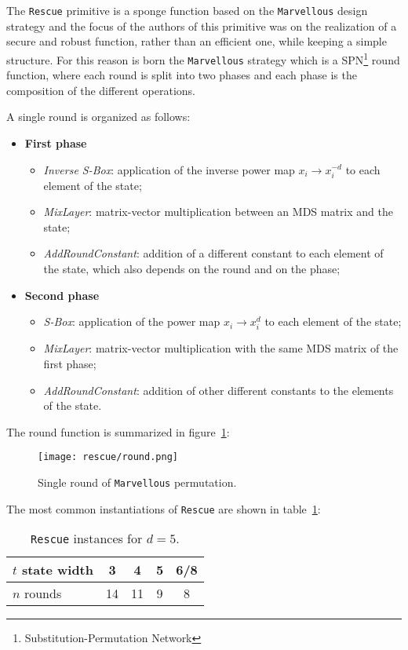 \documentclass[12pt, a4paper]{report}
\begin{document}
The \texttt{Rescue} primitive is a sponge function based on the \texttt{Marvellous} design strategy and the focus of the authors of this primitive was on the realization of a secure and robust function, rather than an efficient one, while keeping a simple structure.
For this reason is born the \texttt{Marvellous} strategy which is a SPN\footnote{Substitution-Permutation Network} round function, where each round is split into two phases and each phase is the composition of the different operations.

A single round is organized as follows:
\begin{itemize}
  \item \textbf{First phase}
  \begin{itemize}
    \item \textit{Inverse S-Box}: application of the inverse power map $x_i \rightarrow x_i^{-d}$ to each element of the state;
    \item \textit{MixLayer}: matrix-vector multiplication between an MDS matrix and the state;
    \item \textit{AddRoundConstant}: addition of a different constant to each element of the state, which also depends on the round and on the phase;
  \end{itemize}
  \item \textbf{Second phase}
  \begin{itemize}
    \item \textit{S-Box}: application of the power map $x_i \rightarrow x_i^d$ to each element of the state;
    \item \textit{MixLayer}: matrix-vector multiplication with the same MDS matrix of the first phase;
    \item \textit{AddRoundConstant}: addition of other different constants to the elements of the state.
  \end{itemize}
\end{itemize}

The round function is summarized in figure~\ref{fig:rescue}:
\begin{figure}[H]
  \begin{center}
    \texttt{[image: rescue/round.png]}
  \end{center}
  \caption{Single round of \texttt{Marvellous} permutation.}\label{fig:rescue}
\end{figure}

The most common instantiations of \texttt{Rescue} are shown in table~\ref{tab:rescueinstances}:
\begin{table}[H]
  \begin{center}
    \begin{tabular}{|l|c|c|c|c|}
      \hline
      $t$ state width & 3 & 4 & 5 & 6/8 \\
      \hline
      $n$ rounds & 14 & 11 & 9 & 8 \\
      \hline
    \end{tabular}
  \end{center}
  \caption{\texttt{Rescue} instances for $d = 5$.}\label{tab:rescueinstances}
\end{table}
\end{document}
